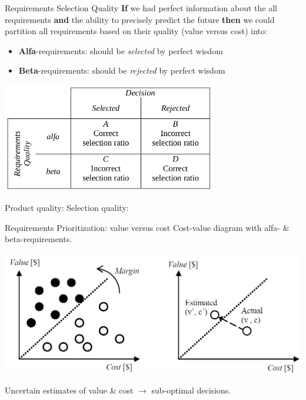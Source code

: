\documentclass{simpleslides}
\begin{document}
\begin{frame}[fragile]{Requirements Selection Quality}
\footnotesize
\textbf{If} we had perfect information about the all requirements \textbf{and} the ability to precisely predict the future \textbf{then} we could partition all requirements based on their quality (value versus cost) into:
\begin{itemize}\footnotesize
\item \textbf{Alfa}-requirements: should be \textit{selected} by perfect wisdom
\item \textbf{Beta}-requirements: should be \textit{rejected} by perfect wisdom
\end{itemize}
\begin{center}
\includegraphics[width=0.7\textwidth]{img/alfa-beta-reqts}
\end{center}
{
Product quality: \hfill
Selection quality:
}
\end{frame}

\begin{frame}[fragile]{Requirements Prioritization: value versus cost}
Cost-value diagram with alfa- \& beta-requirements.
\begin{center}
\includegraphics[width=1.0\textwidth]{img/cost-value}
\end{center}
Uncertain estimates of value \& cost $\rightarrow$ sub-optimal decisions.
\end{frame}
\end{document}
